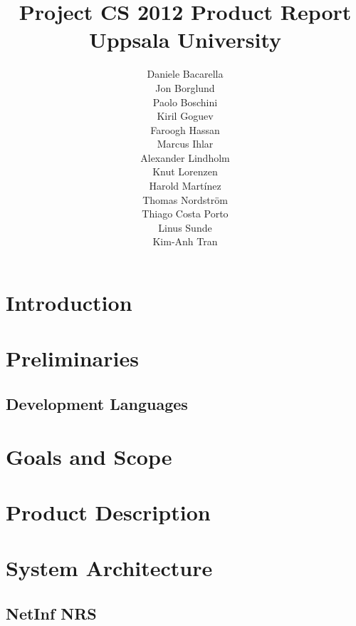 \documentclass[11pt]{report}
\title{Project CS 2012 Product Report\\Uppsala University\\}
\author{Daniele Bacarella\\
		Jon Borglund\\
		Paolo Boschini\\
		Kiril Goguev\\
		Faroogh Hassan\\
		Marcus Ihlar\\
		Alexander Lindholm\\
		Knut Lorenzen\\
		Harold Mart\'{i}nez\\
		Thomas Nordstr\"om\\
		Thiago Costa Porto\\
		Linus Sunde\\
		Kim-Anh Tran
}
\date{}
\begin{document}
\maketitle




\tableofcontents

\chapter{Introduction}


\chapter{Preliminaries}

\section{Development Languages}


\chapter{Goals and Scope}



\chapter{Product Description}





\chapter{System Architecture}



\section {NetInf NRS}




\end{document}
